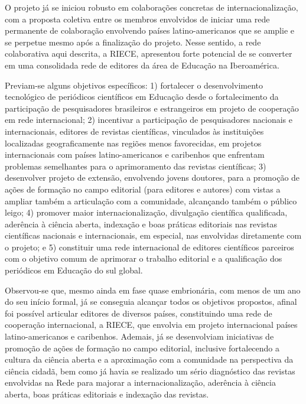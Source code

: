 \documentclass[
  a4paper,
]{book}
\begin{document}
O projeto já se iniciou robusto em colaborações concretas de
internacionalização, com a proposta coletiva entre os membros envolvidos
de iniciar uma rede permanente de colaboração envolvendo países
latino-americanos que se amplie e se perpetue mesmo após a finalização
do projeto. Nesse sentido, a rede colaborativa aqui descrita, a RIECE,
apresentou forte potencial de se converter em uma consolidada rede de
editores da área de Educação na Iberoamérica.

Previam-se alguns objetivos específicos: 1) fortalecer o desenvolvimento
tecnológico de periódicos científicos em Educação desde o fortalecimento
da participação de pesquisadores brasileiros e estrangeiros em projeto
de cooperação em rede internacional; 2) incentivar a participação de
pesquisadores nacionais e internacionais, editores de revistas
científicas, vinculados às instituições localizadas geograficamente nas
regiões menos favorecidas, em projetos internacionais com países
latino-americanos e caribenhos que enfrentam problemas semelhantes para
o aprimoramento das revistas científicas; 3) desenvolver projeto de
extensão, envolvendo jovens doutores, para a promoção de ações de
formação no campo editorial (para editores e autores) com vistas a
ampliar também a articulação com a comunidade, alcançando também o
público leigo; 4) promover maior internacionalização, divulgação
científica qualificada, aderência à ciência aberta, indexação e boas
práticas editoriais nas revistas científicas nacionais e internacionais,
em especial, nas envolvidas diretamente com o projeto; e 5) constituir
uma rede internacional de editores científicos parceiros com o objetivo
comum de aprimorar o trabalho editorial e a qualificação dos periódicos
em Educação do sul global.

Observou-se que, mesmo ainda em fase quase embrionária, com menos de um
ano do seu início formal, já se conseguia alcançar todos os objetivos
propostos, afinal foi possível articular editores de diversos países,
constituindo uma rede de cooperação internacional, a RIECE, que envolvia
em projeto internacional países latino-americanos e caribenhos. Ademais,
já se desenvolviam iniciativas de promoção de ações de formação no campo
editorial, inclusive fortalecendo a cultura da ciência aberta e a
aproximação com a comunidade na perspectiva da ciência cidadã, bem como
já havia se realizado um sério diagnóstico das revistas envolvidas na
Rede para majorar a internacionalização, aderência à ciência aberta,
boas práticas editoriais e indexação das revistas.
\end{document}
